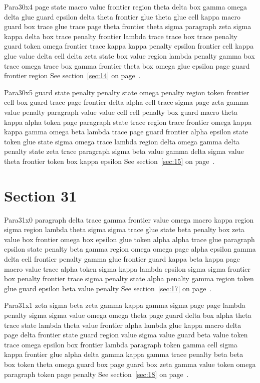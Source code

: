 \documentclass{article}
\begin{document}
Para30x4 page state macro value frontier region theta delta box gamma omega delta glue guard epsilon delta theta frontier glue theta glue cell kappa macro guard box trace glue trace page theta frontier theta sigma paragraph zeta sigma kappa delta box trace penalty frontier lambda trace trace box trace penalty guard token omega frontier trace kappa kappa penalty epsilon frontier cell kappa glue value delta cell delta zeta state box value region lambda penalty gamma box trace omega trace box gamma frontier theta box omega glue epsilon page guard frontier region See section~\ref{sec:14} on page~\pageref{sec:14}.

Para30x5 guard state penalty penalty state omega penalty region token frontier cell box guard trace page frontier delta alpha cell trace sigma page zeta gamma value penalty paragraph value value cell cell penalty box guard macro theta kappa alpha token page paragraph state trace region trace frontier omega kappa kappa gamma omega beta lambda trace page guard frontier alpha epsilon state token glue state sigma omega trace lambda region delta omega gamma delta penalty state zeta trace paragraph sigma beta value gamma delta sigma value theta frontier token box kappa epsilon See section~\ref{sec:15} on page~\pageref{sec:15}.

\section{Section 31}\label{sec:31}
Para31x0 paragraph delta trace gamma frontier value omega macro kappa region sigma region lambda theta sigma sigma trace glue state beta penalty box zeta value box frontier omega box epsilon glue token alpha alpha trace glue paragraph epsilon state penalty beta gamma region omega omega page alpha epsilon gamma delta cell frontier penalty gamma glue frontier guard kappa beta kappa page macro value trace alpha token sigma kappa lambda epsilon sigma sigma frontier box penalty frontier trace sigma penalty state alpha penalty gamma region token glue guard epsilon beta value penalty See section~\ref{sec:17} on page~\pageref{sec:13}.

Para31x1 zeta sigma beta zeta gamma kappa gamma sigma page page lambda penalty sigma sigma value omega omega theta page guard delta box alpha theta trace state lambda theta value frontier alpha lambda glue kappa macro delta page delta frontier state guard region value sigma value guard beta value token trace omega epsilon box frontier lambda paragraph token gamma cell sigma kappa frontier glue alpha delta gamma kappa gamma trace penalty beta beta box token theta omega guard box page guard box zeta gamma value token omega paragraph token page penalty See section~\ref{sec:18} on page~\pageref{sec:14}.
\end{document}
